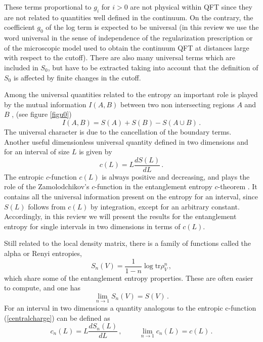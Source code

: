 \documentclass[11pt]{article}
\begin{document}
These terms proportional to $g_i$ for $i> 0$ are not physical within QFT since they are not related to quantities well defined in the continuum. On the contrary, the coefficient $g_0$ of the log term is expected to be universal (in this review we use the word universal in the sense of independence of the regularization prescription or of the microscopic model used to obtain the continuum QFT at distances large with respect to the cutoff). There are also many universal terms which are included in $S_0$, but have to be extracted taking into account that the definition of $S_0$ is affected by finite changes in the cutoff. 
 
Among the universal quantities related to the entropy an important role is played by the mutual information $I(A,B)$ between two non intersecting regions $A$ and $B$ \cite{chuang}, (see figure \ref{figu0})
\begin{equation}
I(A,B)=S(A)+S(B)-S(A\cup B)\,.
\label{mutual}
\end{equation}
The universal character is due to the cancellation of the boundary terms. 
Another useful dimensionless universal quantity defined in two dimensions and for an interval of size $L$ is given by  
\begin{equation}
c(L)=L \frac{dS(L)}{dL}
\,. \label{centralcharge}
\end{equation}
The entropic $c$-function $c(L)$ is always positive and decreasing, and plays the role of the Zamolodchikov's $c$-function \cite{cteor} in the entanglement entropy $c$-theorem \cite{ch1}. It contains all the universal information present on the entropy for an interval, since $S(L)$ follows from $c(L)$ by integration, except for an arbitrary constant. Accordingly, in this review we will present the results for the entanglement entropy for single intervals in two dimensions in terms of $c(L)$.


Still related to the local density matrix, there is a family of functions called the alpha or Renyi entropies,  
\begin{equation}
S_n(V)=\frac{1}{1-n}\log \textrm{tr}\rho^n_V\,,\label{esealfa}
\end{equation}
which share some of the entanglement entropy properties.
These are often easier to compute, and one has
\begin{equation}
\lim_{n\rightarrow 1} S_n(V) =S(V)\,.\label{alpha}
\end{equation}
For an interval in two dimensions a quantity analogous to the entropic c-function (\ref{centralcharge}) can be defined as
\begin{equation}
c_n(L)=L \frac{dS_n(L)}{dL}\,, \hspace{1cm} \lim_{n\rightarrow 1} c_n(L)=c(L)\,.\label{charge1}
\end{equation}
\end{document}
